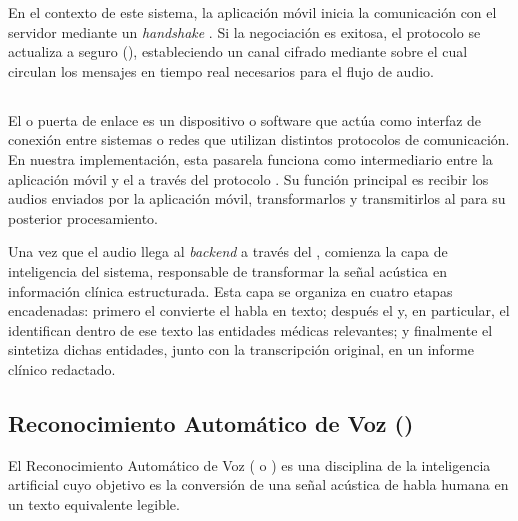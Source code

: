 En el contexto de este sistema, la aplicación móvil inicia la comunicación con el servidor 
mediante un \textit{handshake} . Si la negociación es exitosa, el protocolo se actualiza a  seguro
(), estableciendo un canal cifrado mediante  sobre el cual circulan los mensajes en tiempo real 
necesarios para el flujo de audio.




\subsection{}
El  o puerta de enlace es un dispositivo o software que actúa como interfaz de conexión entre 
sistemas o redes que utilizan distintos protocolos de comunicación. En nuestra implementación, esta pasarela
funciona como intermediario entre la aplicación móvil y el  a través del protocolo
. Su función principal es recibir los audios enviados por la aplicación móvil, 
transformarlos y transmitirlos al  para su posterior procesamiento.

Una vez que el audio llega al \textit{backend} a través del , comienza la capa
de inteligencia del sistema, responsable de transformar la señal acústica en información
clínica estructurada. Esta capa se organiza en cuatro etapas encadenadas: primero el 
convierte el habla en texto; después el  y, en particular, el 
identifican dentro de ese texto las entidades médicas relevantes; y finalmente el 
sintetiza dichas entidades, junto con la transcripción original, en un informe clínico redactado.

\subsection{Reconocimiento Automático de Voz ()}

El Reconocimiento Automático de Voz ( o ) es 
una disciplina de la inteligencia artificial cuyo objetivo es la conversión de una señal acústica de habla
humana en un texto equivalente legible.

